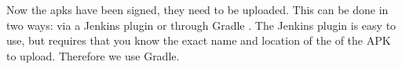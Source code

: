  
Now the apks have been signed, they need to be uploaded. This can be done in two ways: via a Jenkins plugin \parencite{jenkins-play-plugin} or through Gradle \parencite{gradle-play-plugin}. The Jenkins plugin is easy to use, but requires that you know the exact name and location of the of the APK to upload. Therefore we use Gradle. 

